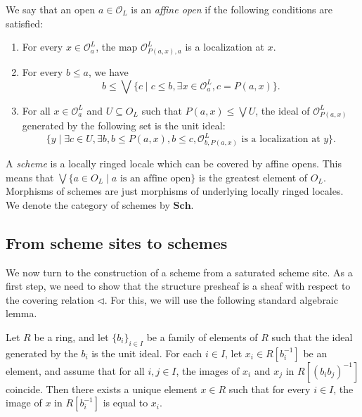 \documentclass[reqno]{amsart}
\theoremstyle{definition}
\theoremstyle{remark}
\numberwithin{figure}{section}
\newcommand{\cover}{\triangleleft}
\newcommand{\cat}[1]{\mathbf{#1}}
\begin{document}
\begin{defn}
We say that an open $a \in \mathcal{O}_L$ is an \emph{affine open} if the following conditions are satisfied:
\begin{enumerate}
\item \label{affine:loc} For every $x \in \mathcal{O}^L_a$, the map $\mathcal{O}^L_{P(a,x),a}$ is a localization at $x$.
\item \label{affine:surj} For every $b \leq a$, we have
\[ b \leq \bigvee \{ c \mid c \leq b, \exists x \in \mathcal{O}^L_a, c = P(a,x) \}. \]
\item \label{affine:cover} For all $x \in \mathcal{O}^L_a$ and $U \subseteq O_L$ such that $P(a,x) \leq \bigvee U$,
the ideal of $\mathcal{O}^L_{P(a,x)}$ generated by the following set is the unit ideal:
\[ \{ y \mid \exists c \in U, \exists b, b \leq P(a,x), b \leq c, \mathcal{O}^L_{b,P(a,x)} \text{ is a localization at } y \}. \]
\end{enumerate}
\end{defn}

A \emph{scheme} is a locally ringed locale which can be covered by affine opens.
This means that $\bigvee \{ a \in O_L \mid a \text{ is an affine open} \}$ is the greatest element of $O_L$.
Morphisms of schemes are just morphisms of underlying locally ringed locales.
We denote the category of schemes by $\cat{Sch}$.

\subsection{From scheme sites to schemes}
\label{sec:scheme-site-to-scheme}

We now turn to the construction of a scheme from a saturated scheme site.
As a first step, we need to show that the structure presheaf is a sheaf with respect to the covering relation $\cover$.
For this, we will use the following standard algebraic lemma.

\begin{lem}
Let $R$ be a ring, and let $\{b_i\}_{i \in I}$ be a family of elements of $R$ such that the ideal generated by the $b_i$ is the unit ideal.
For each $i \in I$, let $x_i \in R[b_i^{-1}]$ be an element, and assume that for all $i,j \in I$, the images of $x_i$ and $x_j$ in $R[(b_i b_j)^{-1}]$ coincide.
Then there exists a unique element $x \in R$ such that for every $i \in I$, the image of $x$ in $R[b_i^{-1}]$ is equal to $x_i$.
\end{lem}
\end{document}

